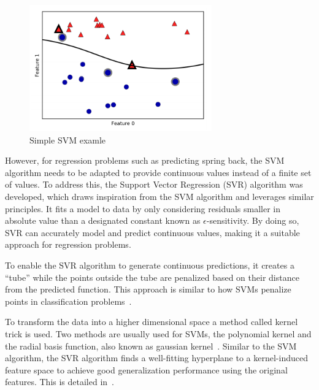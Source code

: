 \begin{figure}[H]
    \begin{tcolorbox}[arc=0pt,boxrule=0.5pt]
        \centering
        \includegraphics[width=0.7\textwidth]{chap4/images/svm_example}
        \caption{Simple \ac{SVM} examle~\cite[p. 94]{muller_introductionmachinelearning_2016}}
        \label{fig:svm-example}
    \end{tcolorbox}
\end{figure}

However, for regression problems such as predicting spring back, the \ac{SVM} algorithm
needs to be adapted to provide continuous values instead of a finite set of values.
To address this, the Support Vector Regression (SVR) algorithm was developed, which draws inspiration from the
\ac{SVM} algorithm and leverages similar principles.
It fits a model to data by only considering residuals smaller in absolute value
than a designated constant known as $\epsilon$-sensitivity.
By doing so, \ac{SVR} can accurately model and predict continuous values, making it a
suitable approach for regression problems.

To enable the \ac{SVR} algorithm to generate continuous predictions, it creates a ``tube''
while the points outside the tube are penalized based on their distance from the
predicted function.
This approach is similar to how \ac{SVM}s penalize points in classification
problems~\cite[p. 369]{montesinoslopez_supportvectormachines_2022}.

To transform the data into a higher dimensional space a method called kernel trick is used.
Two methods are usually used for \ac{SVM}s, the polynomial kernel and the radial basis
function, also known as gaussian kernel~\cite[p. 97--98]{muller_introductionmachinelearning_2016}.
Similar to the \ac{SVM} algorithm, the \ac{SVR} algorithm finds a well-fitting hyperplane to a
kernel-induced feature space to achieve good generalization performance using the original
features.
This is detailed in~\cite[p. 369]{montesinoslopez_supportvectormachines_2022}.

